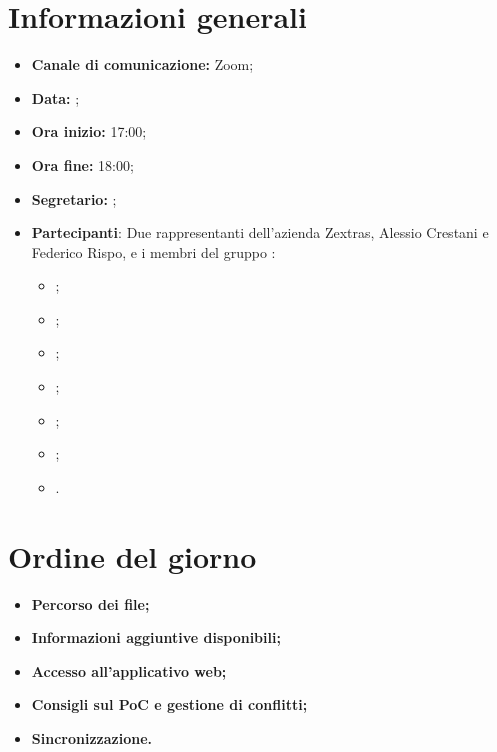 \section{Informazioni generali}

\begin{itemize}

    \item \textbf{Canale di comunicazione:} Zoom;

    \item \textbf{Data:} \DataMeeting{};
    
    \item \textbf{Ora inizio:} 17:00;

    \item \textbf{Ora fine:} 18:00;

    \item \textbf{Segretario:} \Davide{};

    \item \textbf{Partecipanti}: Due rappresentanti dell'azienda Zextras, Alessio Crestani e Federico Rispo,  e i membri del gruppo \Gruppo{}:
    
        \begin{itemize}
            \item \Daniele{};
            \item \Davide{};
            \item \Francesco{};
            \item \Giosue{};
            \item \Lucrezia{};
            \item \Matteo{};
             \item \Tommaso{}.
        \end{itemize}
\end{itemize}

\section{Ordine del giorno}

\begin{itemize}
    \item\textbf{Percorso dei file;}
    \item\textbf{Informazioni aggiuntive disponibili;}
    \item\textbf{Accesso all'applicativo web;}
     \item\textbf{Consigli sul PoC e gestione di conflitti;}
      \item\textbf{Sincronizzazione.}
\end{itemize}
\newpage


